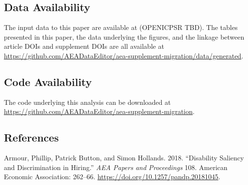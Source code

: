 \documentclass[]{article}
\begin{document}
\hypertarget{data-availability}{%
\subsection{Data Availability}\label{data-availability}}

The input data to this paper are available at (OPENICPSR TBD). The
tables presented in this paper, the data underlying the figures, and the
linkage between article DOIs and supplement DOIs are all available at
\url{https://github.com/AEADataEditor/aea-supplement-migration/data/generated}.

\hypertarget{code-availability}{%
\subsection{Code Availability}\label{code-availability}}

The code underlying this analysis can be downloaded at
\url{https://github.com/AEADataEditor/aea-supplement-migration}.

\hypertarget{references}{%
\subsection*{References}\label{references}}

\hypertarget{refs}{}
\leavevmode\hypertarget{ref-Armour_2018}{}%
Armour, Phillip, Patrick Button, and Simon Hollands. 2018. ``Disability
Saliency and Discrimination in Hiring.'' \emph{AEA Papers and
Proceedings} 108. American Economic Association: 262--66.
\url{https://doi.org/10.1257/pandp.20181045}.
\end{document}
